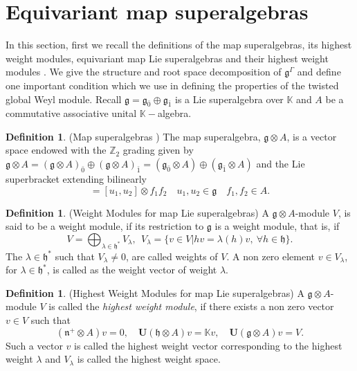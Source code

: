 \documentclass[11pt]{amsart}
\theoremstyle{plain}
\theoremstyle{definition}
\newtheorem{defn}[thm]{Definition}
\newcommand{\g}{\mathfrak{g}}
\newcommand{\h}{\mathfrak{h}}
\newcommand{\n}{\mathfrak{n}}
\begin{document}
\section{Equivariant map superalgebras}\label{sec:2}
In this section, first we recall the definitions of the map superalgebras, its highest weight modules, equivariant map Lie superalgebras and their highest weight modules \cite{Sav14}. We give the structure and root space decomposition of $\g^{\Gamma}$ and define one important condition which we use in defining the properties of the twisted global Weyl module. Recall $\g=\g_{\bar{0}} \oplus \g_{\bar{1}}$ is a Lie superalgebra over $\mathbb{K}$ and $A$ be a commutative associative unital $\mathbb{K}-$algebra.
\begin{defn}(Map superalgebras \cite{BCM19,Sav14})
The map superalgebra, $\g\otimes A$, is a vector space endowed with the $\mathbb{Z}_{2}$ grading given by $\g\otimes A=(\g\otimes A)_{\bar{0}}\oplus(\g\otimes A)_{\bar{1}}=(\g_{\bar{0}}\otimes A)\oplus(\g_{\bar{1}}\otimes A)$ and the Lie superbracket extending bilinearly
\begin{equation*}
    [u_1\otimes f_1,u_2\otimes f_2]=[u_1,u_2]\otimes f_1f_2    \quad u_1,u_2\in\g \quad f_1,f_2\in A.
\end{equation*}
    
\end{defn}
\begin{defn}(Weight Modules for map Lie superalgebras)
  A $\g\otimes A$-module $V$, is said to be a weight module, if its restriction to $\g$ is a weight module, that is, if
  \begin{equation*}
      V=\bigoplus_{\lambda\in\h^*}V_{\lambda},~~V_{\lambda}=\{v\in V|hv=\lambda(h)v,~\forall h\in\h\}.
  \end{equation*}
  The $\lambda\in\h^*$ such that $V_{\lambda}\neq0$, are called weights of $V$. A non zero element  $v\in V_{\lambda}$, for $\lambda\in\h^*$, is called as the weight vector of weight $\lambda$.
\end{defn}
\begin{defn}(Highest Weight Modules for map Lie superalgebras)
A $\g\otimes A$-module $V$ is called the {\em highest weight module}, if there exists a non zero vector $v\in V$ such that \[(\n^+\otimes A)v=0,  \quad   \mathbf{U}(\h\otimes A)v= \mathbb{K}v, \quad\mathbf{U}(\g\otimes A)v=V.\] Such a vector $v$ is called the highest weight vector corresponding to the highest weight $\lambda$ and $V_{\lambda}$ is called the highest weight space.
\end{defn}
\end{document}
